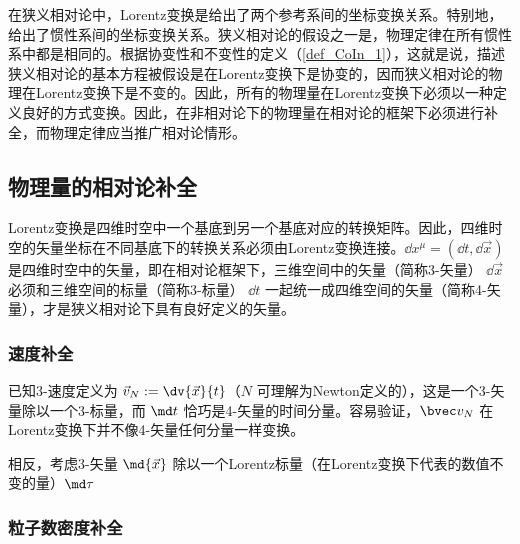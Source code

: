 
在狭义相对论中，Lorentz变换是给出了两个参考系间的坐标变换关系。特别地，给出了惯性系间的坐标变换关系。狭义相对论的假设之一是，物理定律在所有惯性系中都是相同的。根据协变性和不变性的定义（\autoref{def_CoIn_1}），这就是说，描述狭义相对论的基本方程被假设是在Lorentz变换下是协变的，因而狭义相对论的物理在Lorentz变换下是不变的。因此，所有的物理量在Lorentz变换下必须以一种定义良好的方式变换。因此，在非相对论下的物理量在相对论的框架下必须进行补全，而物理定律应当推广相对论情形。
\subsection{物理量的相对论补全}
Lorentz变换是四维时空中一个基底到另一个基底对应的转换矩阵。因此，四维时空的矢量坐标在不同基底下的转换关系必须由Lorentz变换连接。$\dd x^\mu=(\dd t,\dd{\vec x})$ 是四维时空中的矢量，即在相对论框架下，三维空间中的矢量（简称3-矢量） $\dd{\vec x}$ 必须和三维空间的标量（简称3-标量） $\dd t$ 一起统一成四维空间的矢量（简称4-矢量），才是狭义相对论下具有良好定义的矢量。

\subsubsection{速度补全}
已知3-速度定义为 $\vec v_N:=\dv{\vec x}{t}$（$N$ 可理解为Newton定义的），这是一个3-矢量除以一个3-标量，而 $\md t$ 恰巧是4-矢量的时间分量。容易验证，$\bvec v_N$ 在Lorentz变换下并不像4-矢量任何分量一样变换。

相反，考虑3-矢量 $\md{\vec x}$ 除以一个Lorentz标量（在Lorentz变换下代表的数值不变的量）$\md \tau$

\subsubsection{粒子数密度补全}